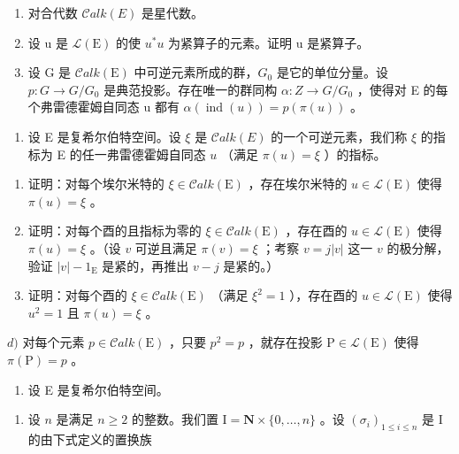 \begin{enumerate}
\def\labelenumi{\alph{enumi})}
\item
  对合代数 \(\mathcal{C}alk(E)\) 是星代数。
\item
  设 u 是 \(\mathcal{L}(\mathrm{E})\) 的使 \(u^{*}u\) 为紧算子的元素。证明 u 是紧算子。
\item
  设 G 是 \(\mathcal{C}alk(\mathrm{E})\) 中可逆元素所成的群，\(G_{0}\) 是它的单位分量。设 \(p: G \to G/G_{0}\) 是典范投影。存在唯一的群同构 \(\alpha: Z \to G/G_{0}\) ，使得对 E 的每个弗雷德霍姆自同态 u 都有 \(\alpha(\operatorname{ind}(u)) = p(\pi(u))\) 。
\end{enumerate}

\begin{enumerate}
\def\labelenumi{\arabic{enumi})}
\setcounter{enumi}{3}
\tightlist
\item
  设 E 是复希尔伯特空间。设 \(\xi\) 是 \(\mathcal{C}alk(E)\) 的一个可逆元素，我们称 \(\xi\) 的指标为 E 的任一弗雷德霍姆自同态 \(u\) （满足 \(\pi(u) = \xi\) ）的指标。
\end{enumerate}

\begin{enumerate}
\def\labelenumi{\alph{enumi})}
\item
  证明：对每个埃尔米特的 \(\xi \in \mathcal{C}alk(\mathrm{E})\) ，存在埃尔米特的 \(u \in \mathcal{L}(\mathrm{E})\) 使得 \(\pi(u) = \xi\) 。
\item
  证明：对每个酉的且指标为零的 \(\xi \in \mathcal{C}alk(\mathrm{E})\) ，存在酉的 \(u \in \mathcal{L}(\mathrm{E})\) 使得 \(\pi(u) = \xi\) 。（设 \(v\) 可逆且满足 \(\pi(v) = \xi\) ；考察 \(v = j|v|\) 这一 \(v\) 的极分解，验证 \(|v| - 1_{\mathrm{E}}\) 是紧的，再推出 \(v - j\) 是紧的。）
\item
  证明：对每个酉的 \(\xi \in \mathcal{C}alk(\mathrm{E})\) （满足 \(\xi^2 = 1\) ），存在酉的 \(u \in \mathcal{L}(\mathrm{E})\) 使得 \(u^2 = 1\) 且 \(\pi(u) = \xi\) 。
\end{enumerate}

\(d)\) 对每个元素 \(p \in \mathcal{C}alk(\mathrm{E})\) ，只要 \(p^2 = p\) ，就存在投影 \(\mathrm{P} \in \mathcal{L}(\mathrm{E})\) 使得 \(\pi(\mathrm{P}) = p\) 。

\begin{enumerate}
\def\labelenumi{\arabic{enumi})}
\setcounter{enumi}{4}
\tightlist
\item
  设 E 是复希尔伯特空间。
\end{enumerate}

\begin{enumerate}
\def\labelenumi{\alph{enumi})}
\tightlist
\item
  设 \(n\) 是满足 \(n \geqslant 2\) 的整数。我们置 \(\mathrm{I} = \mathbf{N} \times \{0, \ldots, n\}\) 。设 \((\sigma_i)_{1 \leqslant i \leqslant n}\) 是 I 的由下式定义的置换族
\end{enumerate}

